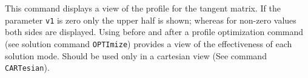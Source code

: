 \headb

This command displays a view of the profile for the tangent matrix.
If the parameter \texttt{v1} is zero only the upper half is shown;
whereas for non-zero values both sides are displayed.  Using before and
after a profile optimization command (see solution command \texttt{OPTImize})
provides a view of the effectiveness of each solution mode.
Should be used only in a cartesian view (See command \texttt{CARTesian}).
\vfill
\eject
